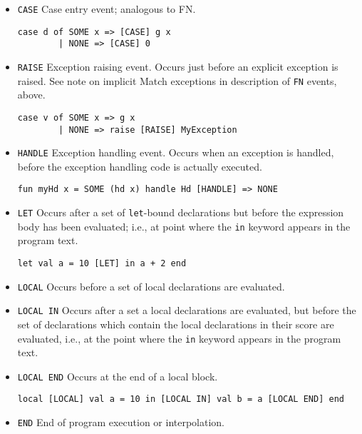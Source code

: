 \begin{itemize}
\item{\verb'CASE'}
Case entry event; analogous to FN.
\begin{verbatim}
case d of SOME x => [CASE] g x
        | NONE => [CASE] 0
\end{verbatim}

\item{\verb'RAISE'} 
Exception raising event.  Occurs just before an explicit exception is raised.  
See note on implicit Match exceptions in description of \verb'FN' events,
above.
\begin{verbatim}
case v of SOME x => g x
        | NONE => raise [RAISE] MyException
\end{verbatim}

\item{\verb'HANDLE'} 
Exception handling event.  Occurs when an exception is
handled, before the exception handling code is actually executed.
\begin{verbatim}
fun myHd x = SOME (hd x) handle Hd [HANDLE] => NONE
\end{verbatim}

\item{\verb'LET'} 
Occurs after a set of {\tt let}-bound declarations
but before the expression body has been evaluated; i.e., at
point where the \verb'in' keyword appears in the program text.
\begin{verbatim}
let val a = 10 [LET] in a + 2 end
\end{verbatim}

\item{\verb'LOCAL'}
Occurs before a set of local declarations are evaluated.

\item{\verb'LOCAL IN'}
Occurs after a set a local declarations are evaluated,
but before the set of declarations which contain the local
declarations in their score are evaluated, i.e., at
the point where the \verb'in' keyword appears in the program text.

\item{\verb'LOCAL END'} Occurs at the end of a local block.
\begin{verbatim}
local [LOCAL] val a = 10 in [LOCAL IN] val b = a [LOCAL END] end
\end{verbatim}

\item{\verb'END'}
End of program execution or interpolation.

\end{itemize}

